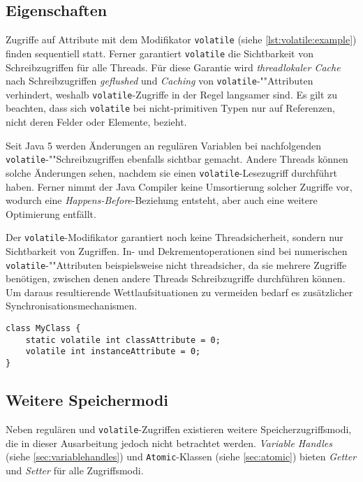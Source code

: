 \documentclass[a4paper, 11pt]{article}
\begin{document}
\subsection{Eigenschaften}
\label{subsec:volatile:properties}

Zugriffe auf Attribute mit dem Modifikator \verb|volatile| (siehe \autoref{lst:volatile:example}) finden sequentiell statt.
Ferner garantiert \verb|volatile| die Sichtbarkeit von Schreibzugriffen für alle Threads.
Für diese Garantie wird \textit{threadlokaler Cache} nach Schreibzugriffen \textit{geflushed} und \textit{Caching} von \verb|volatile|-""Attributen verhindert, weshalb \verb|volatile|-Zugriffe in der Regel langsamer sind.
Es gilt zu beachten, dass sich \verb|volatile| bei nicht-primitiven Typen nur auf Referenzen, nicht deren Felder oder Elemente, bezieht.

Seit Java 5 werden Änderungen an regulären Variablen bei nachfolgenden \verb|volatile|-""Schreibzugriffen ebenfalls sichtbar gemacht.
Andere Threads können solche Änderungen sehen, nachdem sie einen \verb|volatile|-Lesezugriff durchführt haben.
Ferner nimmt der Java Compiler keine Umsortierung solcher Zugriffe vor, wodurch eine \textit{Happens-Before}-Beziehung\autocite{cookbook} entsteht, aber auch eine weitere Optimierung entfällt.

Der \verb|volatile|-Modifikator garantiert noch keine Threadsicherheit, sondern nur Sichtbarkeit von Zugriffen.
In- und Dekrementoperationen sind bei numerischen \verb|volatile|-""Attributen beispielsweise nicht threadsicher, da sie mehrere Zugriffe benötigen, zwischen denen andere Threads Schreibzugriffe durchführen können.
Um daraus resultierende Wettlaufsituationen zu vermeiden bedarf es zusätzlicher Synchronisationsmechanismen.

\begin{lstfloat}
	\begin{lstlisting}[label={lst:volatile:example}, caption={Klasse mit volatile Attributen}]
class MyClass {
	static volatile int classAttribute = 0;
	volatile int instanceAttribute = 0;
}	
	\end{lstlisting}
\end{lstfloat}

\subsection{Weitere Speichermodi}
\label{subsec:volatile:mode}

Neben regulären und \verb|volatile|-Zugriffen existieren weitere Speicherzugriffsmodi, die in dieser Ausarbeitung jedoch nicht betrachtet werden\autocite{memorymodes}.
\textit{Variable Handles} (siehe \autoref{sec:variablehandles}) und \verb|Atomic|-Klassen (siehe \autoref{sec:atomic}) bieten \textit{Getter} und \textit{Setter} für alle Zugriffsmodi.
\end{document}
